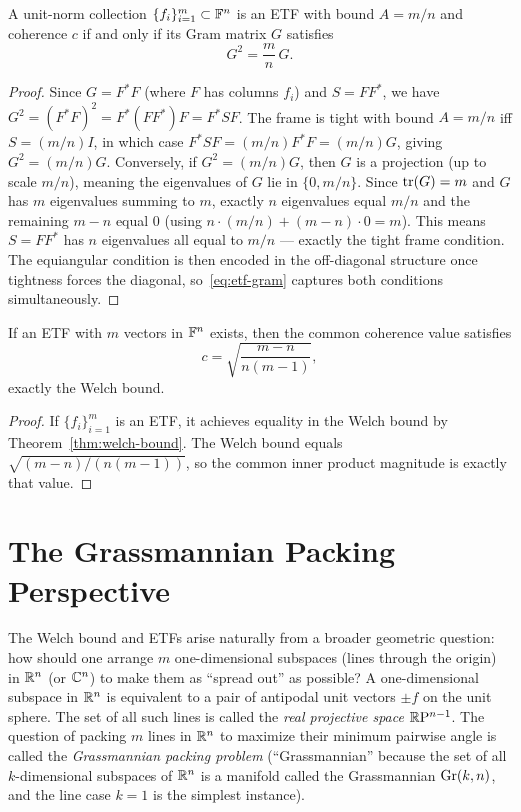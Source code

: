 \begin{proposition}
\label{prop:etf-gram}
A unit-norm collection $\{f_i\}_{i=1}^m \subset \mathbb{F}^n$ is an ETF with
bound $A=m/n$ and coherence $c$ if and only if its Gram matrix
$G$ satisfies
\begin{equation}
\label{eq:etf-gram}
  G^2 = \frac{m}{n}\, G.
\end{equation}
\end{proposition}

\begin{proof}
Since $G=F^*F$ (where $F$ has columns $f_i$) and $S=FF^*$, we have
$G^2=(F^*F)^2=F^*(FF^*)F=F^*SF$. The frame is tight with bound $A=m/n$
iff $S=(m/n)I$, in which case $F^*SF=(m/n)F^*F=(m/n)G$, giving
$G^2=(m/n)G$. Conversely, if $G^2=(m/n)G$, then $G$ is a projection
(up to scale $m/n$), meaning the eigenvalues of $G$ lie in $\{0, m/n\}$.
Since $\operatorname{tr}(G)=m$ and $G$ has $m$ eigenvalues summing to $m$, exactly $n$
eigenvalues equal $m/n$ and the remaining $m-n$ equal $0$ (using $n\cdot(m/n)
+ (m-n)\cdot0 = m$). This means $S=FF^*$ has $n$ eigenvalues all equal
to $m/n$ --- exactly the tight frame condition. The equiangular condition
is then encoded in the off-diagonal structure once tightness forces the
diagonal, so~\eqref{eq:etf-gram} captures both conditions simultaneously.
\end{proof}

\begin{corollary}
\label{cor:etf-necessary}
If an ETF with $m$ vectors in $\mathbb{F}^n$ exists, then the common coherence
value satisfies
\[
  c = \sqrt{\frac{m-n}{n(m-1)}},
\]
exactly the Welch bound.
\end{corollary}

\begin{proof}
If $\{f_i\}_{i=1}^m$ is an ETF, it achieves equality in the Welch bound
by Theorem~\ref{thm:welch-bound}. The Welch bound equals
$\sqrt{(m-n)/(n(m-1))}$, so the common inner product magnitude is exactly
that value.
\end{proof}

\section{The Grassmannian Packing Perspective}
\label{sec:grassmannian}

The Welch bound and ETFs arise naturally from a broader geometric
question: how should one arrange $m$ one-dimensional subspaces (lines
through the origin) in $\mathbb{R}^n$ (or $\mathbb{C}^n$) to make them as ``spread out''
as possible? A one-dimensional subspace in $\mathbb{R}^n$ is equivalent to a
pair of antipodal unit vectors $\pm f$ on the unit sphere. The set of
all such lines is called the \emph{real projective space} $\mathbb{R}\mathrm{P}^{n-1}$.
The question of packing $m$ lines in $\mathbb{R}^n$ to maximize their minimum
pairwise angle is called the \emph{Grassmannian packing problem}
(``Grassmannian'' because the set of all $k$-dimensional subspaces of
$\mathbb{R}^n$ is a manifold called the Grassmannian $\operatorname{Gr}(k,n)$, and the line
case $k=1$ is the simplest instance).

